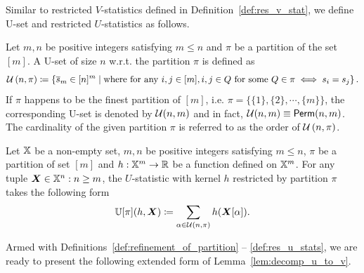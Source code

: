 \documentclass[letterpaper,11pt]{article}
\newcommand{\sPi}{\pi}
\newcommand{\uset}{\calU}
\newcommand{\usetnm}[2]{\uset\left(#1,#2\right)}
\newcommand{\ustat}{\mathbb{U}}
\newcommand{\perm}[1]{\mathsf{Perm}(#1)}
\begin{document}
\begin{bibunit}[plainnat]
Similar to restricted $V$-statistics defined in Definition~\ref{def:res_v_stat}, we define U-set and restricted $U$-statistics as follows. 

\begin{definition}[U-Set]\label{def:u_set}
Let $m,n$ be positive integers satisfying $m \leq n$ and $\sPi$ be a partition of the set $[m]$. A U-set of size $n$ w.r.t. the partition $\sPi$ is defined as
    \begin{align*}
        \usetnm{n}{\sPi} \coloneqq \left\{ \overline{s}_m \in [n]^m \mid \text{where for any $i, j \in [m]$}, i, j \in Q \text{ for some $Q \in \sPi$} \iff   s_i = s_j \right\}.
    \end{align*}
    If $\sPi$ happens to be the finest partition of $[m]$, i.e. $\sPi = \{\{1\}, \{2\}, \cdots, \{m\}\}$, the corresponding U-set is denoted by $\uset(n,m)$ and in fact, $\uset(n,m) \equiv \perm{n,m}$. The cardinality of the given partition $\sPi$ is referred to as the order of $\usetnm{n}{\sPi}$.
\end{definition}

\begin{definition}\label{def:res_u_stats}
    Let ${\mathbb{X}}$ be a non-empty set, $m, n$ be positive integers satisfying $m \leq n$, $\sPi$ be a partition of set $[m]$ and $h: {\mathbb{X}}^{m} \rightarrow {\mathbb{R}}$ be a function defined on ${\mathbb{X}}^m$. For any tuple $\bm{X} \in {\mathbb{X}}^n: n \geq m$, the $U$-statistic with kernel $h$ restricted by partition $\sPi$ takes the following form 
    \begin{align*}
        \ustat[\pi](h, \bm{X}) \coloneqq \sum_{\alpha \in \uset(n,\pi)} h(\bm{X}[\alpha]). 
    \end{align*}
\end{definition}

Armed with Definitions~\ref{def:refinement_of_partition} -- \ref{def:res_u_stats}, we are ready to present the following extended form of Lemma~\ref{lem:decomp_u_to_v}. 


\end{bibunit}
\end{document}
